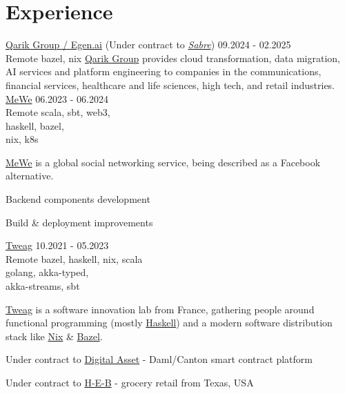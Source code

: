 \section{Experience}
      {\href{https://www.qarik.com}{Qarik Group / Egen.ai} (Under contract to \emph{\href{https://www.sabre.com}{Sabre}})}
      {09.2024 - 02.2025\\Remote}
      {bazel, nix}
      { \href{https://www.qarik.com}{Qarik Group} provides cloud transformation, data migration, AI services
        and platform engineering to companies in the communications, financial services, healthcare and
        life sciences, high tech, and retail industries.
      }
      {\href{https://www.mewe.com}{MeWe}}
      {06.2023 - 06.2024\\Remote}
      {scala, sbt, web3,\\haskell, bazel,\\nix, k8s}
      { \href{mewe.com}{MeWe} is a global social networking service, being described as a Facebook
        alternative.
        \begin{missions}
          \item Backend components development
          \item Build \& deployment improvements
        \end{missions}
      }
      {\href{https://www.tweag.io}{Tweag}}
      {10.2021 - 05.2023\\Remote}
      {bazel, haskell, nix, scala\\golang, akka-typed,\\akka-streams, sbt}
      { \href{tweag.io}{Tweag} is a software innovation lab from France, gathering people around
        functional programming (mostly \href{https://www.haskell.org}{Haskell}) and a modern
        software distribution stack like \href{https://nixos.org}{Nix} \& \href{https://bazel.build}{Bazel}.
        \begin{missions}
          \item Under contract to \href{https://www.digitalasset.com}{Digital Asset} -
          Daml/Canton smart contract platform
          \item Under contract to \href{https://www.heb.com}{H-E-B} -
          grocery retail from Texas, USA
        \end{missions}
      }

